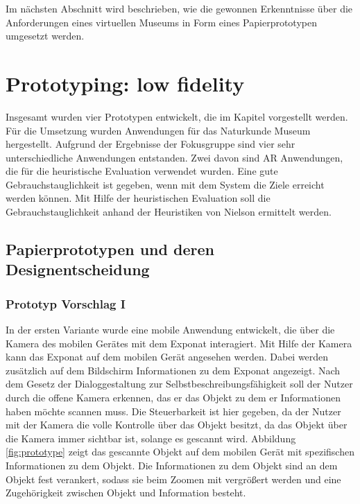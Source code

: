 \documentclass[runningheads,a4paper]{llncs}
\begin{document}





Im nächsten Abschnitt wird beschrieben, wie die gewonnen Erkenntnisse über die Anforderungen eines virtuellen Museums in Form eines Papierprototypen umgesetzt werden.

\section{Prototyping: low fidelity}
Insgesamt wurden vier Prototypen entwickelt, die im Kapitel  vorgestellt werden. Für die Umsetzung wurden Anwendungen für das Naturkunde Museum hergestellt. Aufgrund der Ergebnisse der Fokusgruppe sind vier sehr unterschiedliche Anwendungen entstanden. Zwei davon sind AR Anwendungen, die für die heuristische Evaluation verwendet wurden. Eine gute Gebrauchstauglichkeit ist gegeben, wenn mit dem System die Ziele erreicht werden können. Mit Hilfe der heuristischen Evaluation soll die Gebrauchstauglichkeit anhand der Heuristiken von Nielson ermittelt werden.\\

 
\subsection{Papierprototypen und deren Designentscheidung} \label{chapt:paperprotos}
 
\subsubsection{Prototyp Vorschlag I} \label{chapt:paperprotoI}
In der ersten Variante wurde eine mobile Anwendung entwickelt, die über die Kamera des mobilen Gerätes mit dem Exponat interagiert. Mit Hilfe der Kamera kann das Exponat auf dem mobilen Gerät angesehen werden. Dabei werden zusätzlich auf dem Bildschirm  Informationen zu dem Exponat angezeigt. Nach dem Gesetz der Dialoggestaltung zur Selbstbeschreibungsfähigkeit soll der Nutzer durch die offene Kamera erkennen, das er das Objekt zu dem er Informationen haben möchte scannen muss. Die Steuerbarkeit ist hier gegeben, da der Nutzer mit der Kamera die volle Kontrolle über das Objekt besitzt, da das Objekt über die Kamera immer sichtbar ist, solange es gescannt wird. Abbildung \ref{fig:prototype} zeigt das gescannte Objekt auf dem mobilen Gerät mit spezifischen Informationen zu dem Objekt. Die Informationen zu dem Objekt sind an dem Objekt fest verankert, sodass sie beim Zoomen mit vergrößert werden und eine Zugehörigkeit zwischen Objekt und Information besteht.\\
\end{document}
